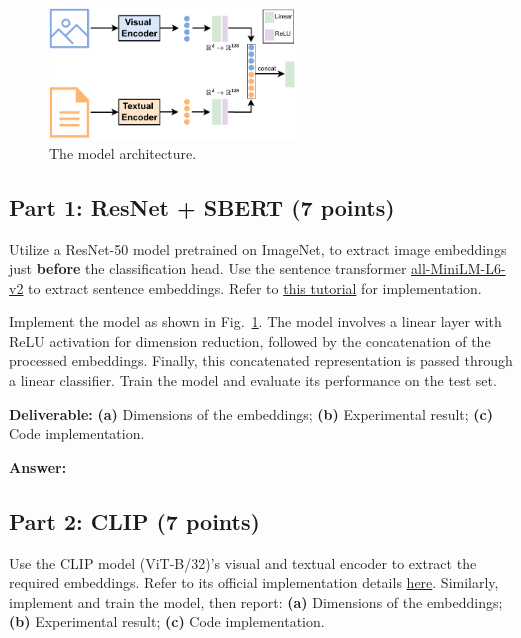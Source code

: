 \documentclass[11pt, oneside]{article}   	%
\begin{document}
\begin{figure}[h]
    \centering
  \includegraphics[width=0.6\textwidth]{images/model.pdf}
  \caption{The model architecture.}
  \label{fig:model}
\end{figure}

\subsection*{Part 1: ResNet + SBERT (7 points)}

Utilize a ResNet-50 model pretrained on ImageNet, to extract image embeddings just \textbf{before} the classification head. Use the sentence transformer \href{https://huggingface.co/sentence-transformers/all-MiniLM-L6-v2}{all-MiniLM-L6-v2} to extract sentence embeddings. Refer to \href{https://huggingface.co/sentence-transformers/all-MiniLM-L6-v2#usage-sentence-transformers}{this tutorial} for implementation.

Implement the model as shown in Fig.~\ref{fig:model}. The model involves a linear layer with ReLU activation for dimension reduction, followed by the concatenation of the processed embeddings. Finally, this concatenated representation is passed through a linear classifier. Train the model and evaluate its performance on the test set. 

\textbf{Deliverable:} \textbf{(a)} Dimensions of the embeddings; \textbf{(b)} Experimental result; \textbf{(c)} Code implementation.

\textbf{Answer:} \\


\subsection*{Part 2: CLIP (7 points)}
 Use the CLIP model (ViT-B/32)'s visual and textual encoder to extract the required embeddings. Refer to its official implementation details \href{https://github.com/openai/CLIP}{here}. Similarly, implement and train the model, then report: \textbf{(a)} Dimensions of the embeddings; \textbf{(b)} Experimental result; \textbf{(c)} Code implementation.
\end{document}
